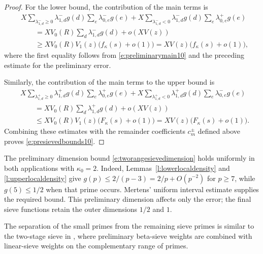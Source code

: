 \documentclass[12pt,reqno]{amsart}
\numberwithin{equation}{section}
\theoremstyle{definition}
\theoremstyle{remark}
\begin{document}
\begin{proof}
For the lower bound, the contribution of the main terms is
\begin{align*}
 &X\sum_{\lambda_{1,d}^-\geq0}
 \lambda_{1,d}^-g(d)
 \sum_e\lambda_{0,e}^-g(e)
 +X\sum_{\lambda_{1,d}^-<0}
 \lambda_{1,d}^-g(d)
 \sum_e\lambda_{0,e}^+g(e)\\
 &\qquad=
 XV_0(R)\sum_d\lambda_{1,d}^-g(d)+o(XV(z))\\
 &\qquad\geq
 XV_0(R)V_1(z)\bigl(f_\kappa(s)+o(1)\bigr)
 =
 XV(z)\bigl(f_\kappa(s)+o(1)\bigr),
\end{align*}
where the first equality follows from
\eqref{e:preliminarymain10} and the preceding estimate for the
preliminary error.

Similarly, the contribution of the main terms to the upper bound is
\begin{align*}
 &X\sum_{\lambda_{1,d}^+\geq0}
 \lambda_{1,d}^+g(d)
 \sum_e\lambda_{0,e}^+g(e)
 +X\sum_{\lambda_{1,d}^+<0}
 \lambda_{1,d}^+g(d)
 \sum_e\lambda_{0,e}^-g(e)\\
 &\qquad=
 XV_0(R)\sum_d\lambda_{1,d}^+g(d)+o(XV(z))\\
 &\qquad\leq
 XV_0(R)V_1(z)\bigl(F_\kappa(s)+o(1)\bigr)
 =
 XV(z)\bigl(F_\kappa(s)+o(1)\bigr).
\end{align*}
Combining these estimates with the remainder coefficients
\(c_m^\pm\) defined above proves \eqref{e:presievedbounds10}.
\end{proof}

The preliminary dimension bound
\eqref{e:tworangesievedimension} holds uniformly in both
applications with \(\kappa_0=2\). Indeed,
Lemmas~\ref{l:lowerlocaldensity} and
\ref{l:upperlocaldensity} give
\(g(p)\leq2/(p-3)=2/p+O(p^{-2})\) for \(p\geq7\), while
\(g(5)\leq1/2\) when that prime occurs. Mertens' uniform interval
estimate supplies the required bound. This preliminary
dimension affects only the error; the final sieve functions
retain the outer dimensions \(1/2\) and \(1\).


The separation of the small primes from the remaining sieve primes is
similar to the two-stage sieve in
\cite[Section~2, especially (14)--(16)]{MatomakiAlmostPrimes},
where preliminary beta-sieve weights are combined with linear-sieve
weights on the complementary range of primes.
\end{document}
